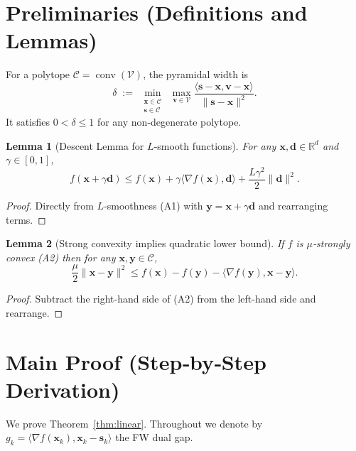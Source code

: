 \documentclass{article}
\newtheorem{lemma}{Lemma}
\newcommand{\conv}{\operatorname*{conv}}
\newcommand{\R}{\mathbb{R}}
\begin{document}
\section*{Preliminaries (Definitions and Lemmas)}
\begin{definition}\label{def:pyr}
For a polytope $\mathcal{C}=\conv(\mathcal{V})$, the pyramidal width is
\[
\delta \;:=\; \min_{\substack{\bm{x}\in\mathcal{C}\\\bm{s}\in\mathcal{C}}}
\;\max_{\bm{v}\in\mathcal{V}}
\frac{\langle \bm{s}-\bm{x},\bm{v}-\bm{x}\rangle}{\|\bm{s}-\bm{x}\|^{2}}.
\]
It satisfies $0<\delta\le 1$ for any non‑degenerate polytope. \hfill\qedsymbol
\end{definition}

\begin{lemma}[Descent Lemma for $L$‑smooth functions]\label{lem:descent}
For any $\bm{x},\bm{d}\in\R^{d}$ and $\gamma\in[0,1]$,
\[
f(\bm{x}+\gamma\bm{d})\le f(\bm{x})+\gamma\langle\nabla f(\bm{x}),\bm{d}\rangle+\frac{L\gamma^{2}}{2}\|\bm{d}\|^{2}. \tag{2}
\]
\end{lemma}
\begin{proof}
Directly from $L$‑smoothness (A1) with $\bm{y}=\bm{x}+\gamma\bm{d}$ and rearranging terms. \hfill\qedsymbol
\end{proof}

\begin{lemma}[Strong convexity implies quadratic lower bound]\label{lem:strong}
If $f$ is $\mu$‑strongly convex (A2) then for any $\bm{x},\bm{y}\in\mathcal{C}$,
\[
\frac{\mu}{2}\|\bm{x}-\bm{y}\|^{2}\le f(\bm{x})-f(\bm{y})-\langle\nabla f(\bm{y}),\bm{x}-\bm{y}\rangle. \tag{3}
\]
\end{lemma}
\begin{proof}
Subtract the right‑hand side of (A2) from the left‑hand side and rearrange. \hfill\qedsymbol
\end{proof}

\section*{Main Proof (Step‑by‑Step Derivation)}
We prove Theorem~\ref{thm:linear}.  Throughout we denote by $g_{k}=\langle\nabla f(\bm{x}_{k}),\bm{x}_{k}-\bm{s}_{k}\rangle$ the FW dual gap.
\end{document}
